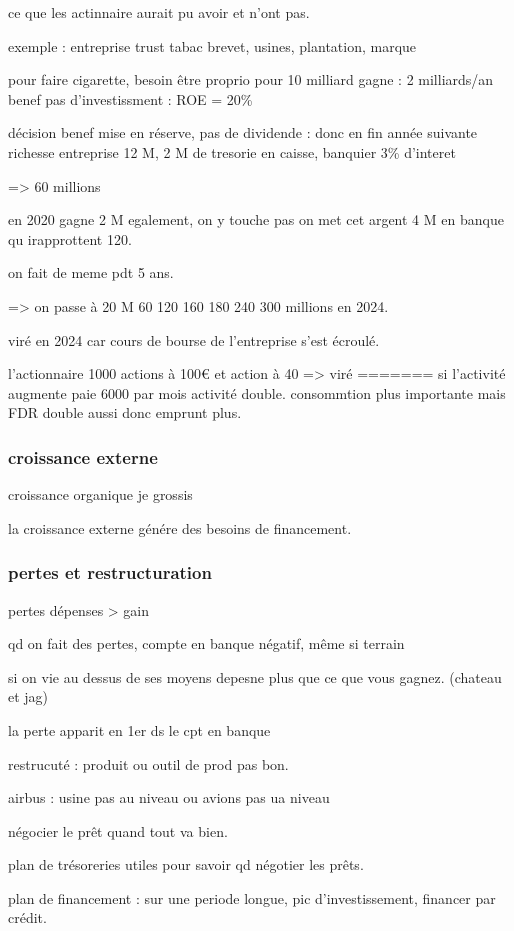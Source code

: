 \documentclass[a4paper,12pt]{article}
\begin{document}
ce que les actinnaire aurait pu avoir et n'ont pas.

exemple : entreprise trust tabac
brevet, usines, plantation, marque

pour faire cigarette, besoin être proprio pour 10 milliard
gagne : 2 milliards/an benef
pas d'investissment : ROE = 20\%


décision benef mise en réserve, pas de dividende : donc en fin année suivante richesse
entreprise 12 M, 2 M de tresorie en caisse, banquier 3\% d'interet

=> 60 millions 

en 2020 gagne 2 M egalement, on y touche pas 
on met cet argent  4 M en banque qu irapprottent 120.

on fait de meme pdt 5 ans.

=> on passe à 20 M 60 120 160 180 240 300 millions en 2024.

viré en 2024 car cours de bourse de l'entreprise s'est écroulé.

l'actionnaire 1000 actions à 100€ et action à 40 => viré
=======
si l'activité augmente paie 6000 par mois activité double.
consommtion plus importante mais FDR double aussi donc emprunt plus.


\subsubsection{croissance externe}
croissance organique je grossis

la croissance externe génére des besoins de financement.


\subsubsection{pertes et restructuration}
pertes dépenses > gain

qd on fait des pertes, compte en banque négatif, même si terrain

si on vie au dessus de ses moyens depesne plus que ce que vous gagnez. (chateau et jag)

la perte apparit en 1er ds le cpt en banque

restrucuté : produit ou outil de prod pas bon.

airbus : usine pas au niveau ou avions pas ua niveau

négocier le prêt quand tout va bien.

plan de trésoreries utiles pour savoir qd négotier les prêts.

plan de financement : sur une periode longue, pic d'investissement, financer par crédit.
\end{document}
